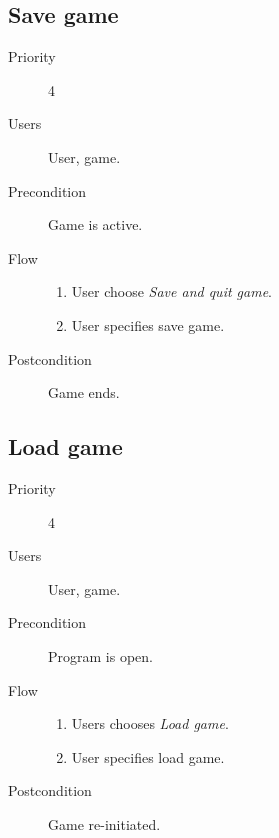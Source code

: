 \documentclass[12pt,a4paper]{article}
\begin{document}
\subsection{Save game}
\begin{description}
\item[Priority] 4
\item[Users] User, game.
\item[Precondition] Game is active.
\item[Flow]\mbox{}
  \begin{enumerate}
  \item User choose \emph{Save and quit game}.
  \item User specifies save game.
  \end{enumerate}
\item[Postcondition]  Game ends.
\end{description}

\subsection{Load game}
\begin{description}
\item[Priority] 4
\item[Users] User, game.
\item[Precondition] Program is open.
\item[Flow]\mbox{}
  \begin{enumerate}
  \item Users chooses \emph{Load game}.
  \item User specifies load game.
  \end{enumerate}
\item[Postcondition] Game re-initiated.
\end{description}
\end{document}
